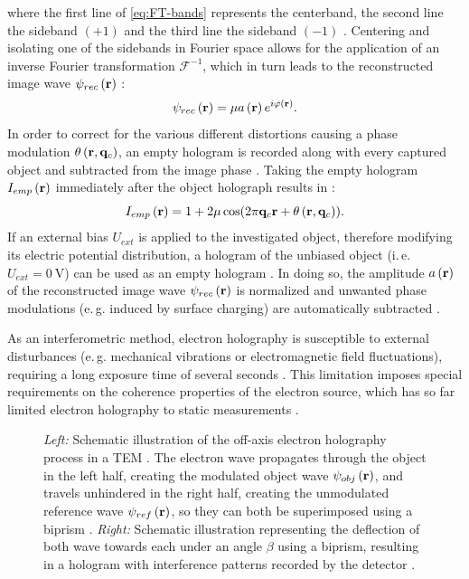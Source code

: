 where the first line of \cref{eq:FT-bands} represents the centerband, the second line the sideband $\left(+1\right)$ and the third line the sideband $\left(-1\right)$ \cite{Lehmann1994,Voelkl1995}. Centering and isolating one of the sidebands in Fourier space allows for the application of an inverse Fourier transformation $\mathcal{F}^{-1}$, which in turn leads to the reconstructed image wave ${\psi}_{rec}\left(\vb{r}\right)$ \cite{Lehmann1994,Voelkl1995}:
\begin{equation}
	{\psi}_{rec}\left(\vb{r}\right) = \mu a\left(\vb{r}\right)e^{i\varphi\left(\vb{r}\right)}.
\end{equation}
In order to correct for the various different distortions causing a phase modulation $\theta\left(\vb{r},\vb{q}_c\right)$, an empty hologram is recorded along with every captured object and subtracted from the image phase \cite{voelkl1999,Lichte2007}. Taking the empty hologram $I_{emp}\left(\vb{r}\right)$ immediately after the object holograph results in \cite{voelkl1999}:
\begin{equation}
	I_{emp}\left(\vb{r}\right) = 1 + 2\mu \cos(2\pi \vb{q}_c \vb{r} + \theta\left(\vb{r}, \vb{q}_c\right)).
\end{equation}
If an external bias $U_{ext}$ is applied to the investigated object, therefore modifying its electric potential distribution, a hologram of the unbiased object (i.\,e. $U_{ext} = \SI{0}{\volt}$) can be used as an empty hologram \cite{Niermann2017,Wagner2019}. In doing so, the amplitude $a\left(\vb{r}\right)$ of the reconstructed image wave ${\psi}_{rec}\left(\vb{r}\right)$ is normalized and unwanted phase modulations (e.\,g. induced by surface charging) are automatically subtracted \cite{Wagner2019}.

As an interferometric method, electron holography is susceptible to external disturbances (e.\,g. mechanical vibrations or electromagnetic field fluctuations), requiring a long exposure time of several seconds \cite{Niermann2017}. This limitation imposes special requirements on the coherence properties of the electron source, which has so far limited electron holography to static measurements \cite{Niermann2017}.%
\begin{figure}[H]
	\centering
	\caption{\emph{Left:} Schematic illustration of the off-axis electron holography process in a TEM \cite{Lehmann2002,Lichte2007}. The electron wave propagates through the object in the left half, creating the modulated object wave ${\psi}_{obj}\left(\vb{r}\right)$, and travels unhindered in the right half, creating the unmodulated reference wave ${\psi}_{ref}\left(\vb{r}\right)$, so they can both be superimposed using a biprism \cite{Lehmann2002,Lichte2007}. \emph{Right:} Schematic illustration representing the deflection of both wave towards each under an angle $\beta$ using a biprism, resulting in a hologram with interference patterns recorded by the detector \cite{Lehmann2002,Lichte2007}.}
	\label{fig:EH-setup}
\end{figure}
\newpage
